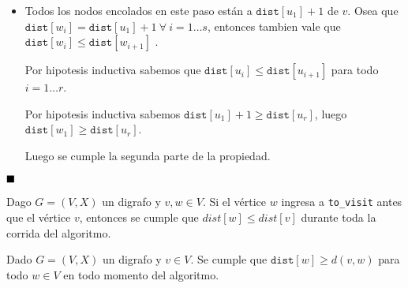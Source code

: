 \begin{demoPart}
  \begin{itemize}
    \begin{itemize}
      \item Todos los nodos encolados en este paso están a \(\texttt{dist}[u_1] + 1\) de \(v\). Osea que \(\texttt{dist}[w_i] = \texttt{dist}[u_1] + 1~\forall~i=1\dots s\), entonces tambien vale que \(\texttt{dist}[w_i] \leq \texttt{dist}[w_{i+1}]\) .

            Por hipotesis inductiva sabemos que \(\texttt{dist}[u_i] \leq \texttt{dist}[u_{i+1}]\) para todo \(i=1\dots r\).

            Por hipotesis inductiva sabemos \(\texttt{dist}[u_1]+1 \geq \texttt{dist}[u_r]\), luego \(\texttt{dist}[w_1] \geq \texttt{dist}[u_r]\).

            Luego se cumple la segunda parte de la propiedad.
    \end{itemize}
  \end{itemize}
  \(\null\hfill\blacksquare\)
\end{demoPart}

\begin{coro}
  Dago \(G=(V,X)\) un digrafo y \(v,w\in V\). Si el vértice \(w\) ingresa a \texttt{to\_visit} antes que el vértice \(v\), entonces se cumple que \(dist[w]\leq dist[v]\) durante toda la corrida del algoritmo.
\end{coro}

\begin{lema}\label{lema::BFS::distMayorAd}
  Dado \(G=(V, X)\) un digrafo y \(v\in V\). Se cumple que \(\texttt{dist}[w]\geq d(v,w)\) para todo \(w\in V\) en todo momento del algoritmo.
\end{lema}

